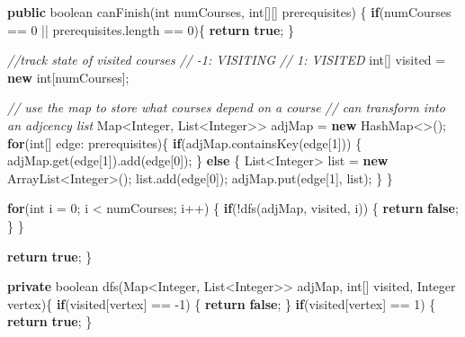 \documentclass[]{book}
\newenvironment{Shaded}{\begin{snugshade}}{\end{snugshade}}
\newcommand{\BuiltInTok}[1]{#1}
\newcommand{\CommentTok}[1]{\textcolor[rgb]{0.56,0.35,0.01}{\textit{#1}}}
\newcommand{\DataTypeTok}[1]{\textcolor[rgb]{0.13,0.29,0.53}{#1}}
\newcommand{\DecValTok}[1]{\textcolor[rgb]{0.00,0.00,0.81}{#1}}
\newcommand{\FunctionTok}[1]{\textcolor[rgb]{0.00,0.00,0.00}{#1}}
\newcommand{\KeywordTok}[1]{\textcolor[rgb]{0.13,0.29,0.53}{\textbf{#1}}}
\newcommand{\NormalTok}[1]{#1}
\begin{document}
\begin{Shaded}
\begin{Highlighting}[]
\KeywordTok{public} \DataTypeTok{boolean} \FunctionTok{canFinish}\NormalTok{(}\DataTypeTok{int}\NormalTok{ numCourses, }\DataTypeTok{int}\NormalTok{[][] prerequisites) \{}
    \KeywordTok{if}\NormalTok{(numCourses == }\DecValTok{0}\NormalTok{ || prerequisites.}\FunctionTok{length}\NormalTok{ == }\DecValTok{0}\NormalTok{)\{}
        \KeywordTok{return} \KeywordTok{true}\NormalTok{;}
\NormalTok{    \}}

    \CommentTok{//track state of visited courses}
    \CommentTok{// -1: VISITING}
    \CommentTok{//  1: VISITED}
    \DataTypeTok{int}\NormalTok{[] visited = }\KeywordTok{new} \DataTypeTok{int}\NormalTok{[numCourses];}

    \CommentTok{// use the map to store what courses depend on a course}
    \CommentTok{// can transform into an adjcency list}
    \BuiltInTok{Map}\NormalTok{<}\BuiltInTok{Integer}\NormalTok{, }\BuiltInTok{List}\NormalTok{<}\BuiltInTok{Integer}\NormalTok{>> adjMap = }\KeywordTok{new} \BuiltInTok{HashMap}\NormalTok{<>();}
    \KeywordTok{for}\NormalTok{(}\DataTypeTok{int}\NormalTok{[] edge: prerequisites)\{}
        \KeywordTok{if}\NormalTok{(adjMap.}\FunctionTok{containsKey}\NormalTok{(edge[}\DecValTok{1}\NormalTok{])) \{}
\NormalTok{            adjMap.}\FunctionTok{get}\NormalTok{(edge[}\DecValTok{1}\NormalTok{]).}\FunctionTok{add}\NormalTok{(edge[}\DecValTok{0}\NormalTok{]);}
\NormalTok{        \} }\KeywordTok{else}\NormalTok{ \{}
            \BuiltInTok{List}\NormalTok{<}\BuiltInTok{Integer}\NormalTok{> list = }\KeywordTok{new} \BuiltInTok{ArrayList}\NormalTok{<}\BuiltInTok{Integer}\NormalTok{>();}
\NormalTok{            list.}\FunctionTok{add}\NormalTok{(edge[}\DecValTok{0}\NormalTok{]);}
\NormalTok{            adjMap.}\FunctionTok{put}\NormalTok{(edge[}\DecValTok{1}\NormalTok{], list);}
\NormalTok{        \}}
\NormalTok{    \}}

    \KeywordTok{for}\NormalTok{(}\DataTypeTok{int}\NormalTok{ i = }\DecValTok{0}\NormalTok{; i < numCourses; i++) \{}
        \KeywordTok{if}\NormalTok{(!}\FunctionTok{dfs}\NormalTok{(adjMap, visited, i)) \{}
            \KeywordTok{return} \KeywordTok{false}\NormalTok{;}
\NormalTok{        \}}
\NormalTok{    \}}

    \KeywordTok{return} \KeywordTok{true}\NormalTok{;}
\NormalTok{\}}

\KeywordTok{private} \DataTypeTok{boolean} \FunctionTok{dfs}\NormalTok{(}\BuiltInTok{Map}\NormalTok{<}\BuiltInTok{Integer}\NormalTok{, }\BuiltInTok{List}\NormalTok{<}\BuiltInTok{Integer}\NormalTok{>> adjMap, }\DataTypeTok{int}\NormalTok{[] visited, }\BuiltInTok{Integer}\NormalTok{ vertex)\{}
    \KeywordTok{if}\NormalTok{(visited[vertex] == }\DecValTok{-1}\NormalTok{) \{}
        \KeywordTok{return} \KeywordTok{false}\NormalTok{;}
\NormalTok{    \}}
    \KeywordTok{if}\NormalTok{(visited[vertex] == }\DecValTok{1}\NormalTok{) \{}
        \KeywordTok{return} \KeywordTok{true}\NormalTok{;}
\NormalTok{    \}}


\end{Highlighting}
\end{Shaded}
\end{document}
